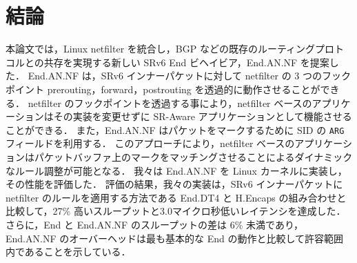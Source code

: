 \chapter{結論}
\label{chap:conclusion}
本論文では，Linux netfilter を統合し，BGP などの既存のルーティングプロトコルとの共存を実現する新しい SRv6 End ビヘイビア，End.AN.NF を提案した．
End.AN.NF は，SRv6 インナーパケットに対して netfilter の 3 つのフックポイント prerouting，forward，postrouting を透過的に動作させることができる．
netfilter のフックポイントを透過する事により，netfilter ベースのアプリケーションはその実装を変更せずに SR-Aware アプリケーションとして機能させることができる．
また，End.AN.NF はパケットをマークするために SID の \texttt{ARG} フィールドを利用する．
このアプローチにより，netfilter ベースのアプリケーションはパケットバッファ上のマークをマッチングさせることによるダイナミックなルール調整が可能となる．
我々は End.AN.NF を Linux カーネルに実装し，その性能を評価した．
評価の結果，我々の実装は，SRv6 インナーパケットに netfilter のルールを適用する方法である End.DT4 と H.Encaps の組み合わせと比較して，27\% 高いスループットと3.0マイクロ秒低いレイテンシを達成した．
さらに，End と End.AN.NF のスループットの差は 6\% 未満であり，End.AN.NF のオーバーヘッドは最も基本的な End の動作と比較して許容範囲内であることを示している．
